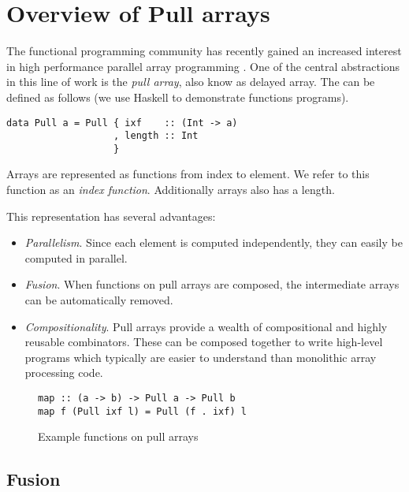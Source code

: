 \documentclass{sigplanconf}
\begin{document}
\section{Overview of Pull arrays}

The functional programming community has recently gained an increased
interest in high performance parallel array programming
\cite{keller2010regular,Axelsson:2010:Feldspar,Mainland:2010:Nikola,Svensson:2011:Obsidian,Claessen:2012:Expressive,Ankner:2013:AnEDSL,lippmeier2011efficient}. One
of the central abstractions in this line of work is the \emph{pull
  array}, also know as delayed array. The can be defined as follows
(we use Haskell \cite{marlow2010haskell} to demonstrate functions
programs).

\begin{verbatim}
data Pull a = Pull { ixf    :: (Int -> a)
                   , length :: Int
                   }
\end{verbatim}

Arrays are represented as functions from index to element. We refer to
this function as an \emph{index function}. Additionally arrays also
has a length.

This representation has several advantages:
\begin{itemize}
\item \emph{Parallelism}. Since each element is computed
  independently, they can easily be computed in parallel.
\item \emph{Fusion}. When functions on pull arrays are composed, the intermediate
  arrays can be automatically removed. 
\item \emph{Compositionality}. Pull arrays provide a wealth of
  compositional and highly reusable combinators. These can be composed
  together to write high-level programs which typically are easier to
  understand than monolithic array processing code.
\end{itemize}

\begin{figure}
\begin{verbatim}
map :: (a -> b) -> Pull a -> Pull b
map f (Pull ixf l) = Pull (f . ixf) l
\end{verbatim}
\caption{Example functions on pull arrays}
\end{figure}

\subsection{Fusion}
\end{document}
